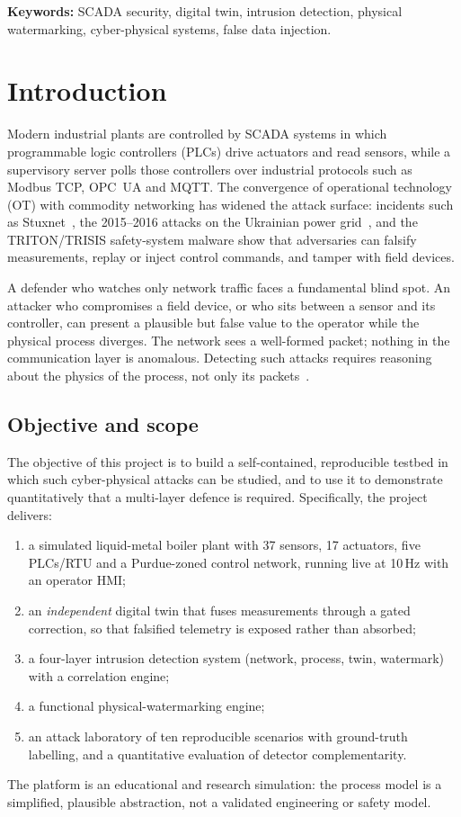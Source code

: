 \documentclass[11pt,a4paper]{article}
\begin{document}
\medskip
\noindent\textbf{Keywords:} SCADA security, digital twin, intrusion detection, physical watermarking, cyber-physical systems, false data injection.

\section{Introduction}
Modern industrial plants are controlled by SCADA systems in which programmable logic controllers (PLCs) drive actuators and read sensors, while a supervisory server polls those controllers over industrial protocols such as Modbus TCP, OPC~UA and MQTT. The convergence of operational technology (OT) with commodity networking has widened the attack surface: incidents such as Stuxnet~\cite{stuxnet}, the 2015--2016 attacks on the Ukrainian power grid~\cite{ukraine}, and the TRITON/TRISIS safety-system malware show that adversaries can falsify measurements, replay or inject control commands, and tamper with field devices.

A defender who watches only network traffic faces a fundamental blind spot. An attacker who compromises a field device, or who sits between a sensor and its controller, can present a plausible but false value to the operator while the physical process diverges. The network sees a well-formed packet; nothing in the communication layer is anomalous. Detecting such attacks requires reasoning about the physics of the process, not only its packets~\cite{cardenas,urbina}.

\subsection{Objective and scope}
The objective of this project is to build a self-contained, reproducible testbed in which such cyber-physical attacks can be studied, and to use it to demonstrate quantitatively that a multi-layer defence is required. Specifically, the project delivers:
\begin{enumerate}
\item a simulated liquid-metal boiler plant with 37 sensors, 17 actuators, five PLCs/RTU and a Purdue-zoned control network, running live at 10\,Hz with an operator HMI;
\item an \emph{independent} digital twin that fuses measurements through a gated correction, so that falsified telemetry is exposed rather than absorbed;
\item a four-layer intrusion detection system (network, process, twin, watermark) with a correlation engine;
\item a functional physical-watermarking engine;
\item an attack laboratory of ten reproducible scenarios with ground-truth labelling, and a quantitative evaluation of detector complementarity.
\end{enumerate}
The platform is an educational and research simulation: the process model is a simplified, plausible abstraction, not a validated engineering or safety model.
\end{document}
